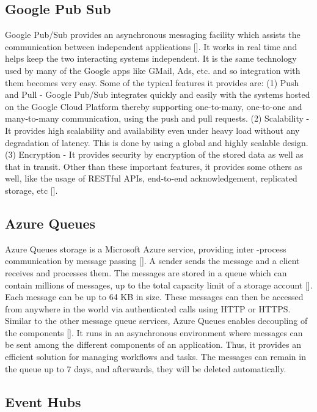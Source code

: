 \subsection{Google Pub Sub}

Google Pub/Sub provides an asynchronous messaging facility which
assists the communication between independent applications
 [\cite{www-google-pub-sub}]. It works in real time and helps keep the
two interacting systems independent. It is the same technology used by
many of the Google apps like GMail, Ads, etc. and so integration with
them becomes very easy.  Some of the typical features it provides are:
(1) Push and Pull - Google Pub/Sub integrates quickly and easily with
the systems hosted on the Google Cloud Platform thereby supporting
one-to-many, one-to-one and many-to-many communication, using the push
and pull requests. (2) Scalability - It provides high scalability and
availability even under heavy load without any degradation of
latency. This is done by using a global and highly scalable
design. (3) Encryption - It provides security by encryption of the
stored data as well as that in transit. Other than these important
features, it provides some others as well, like the usage of RESTful
APIs, end-to-end acknowledgement, replicated storage,
etc [\cite{www-google-pub-sub-features}].
     
\subsection{Azure Queues}

Azure Queues storage is a Microsoft Azure service, providing inter
-process communication by message
passing [\cite{silberschatz1998operating}].  A sender sends the message
and a client receives and processes them.  The messages are stored in
a queue which can contain millions of messages, up to the total
capacity limit of a storage account [\cite{www-azurequeue-web}].  Each
message can be up to 64 KB in size. These messages can then be
accessed from anywhere in the world via authenticated calls using HTTP
or HTTPS. Similar to the other message queue services, Azure Queues
enables decoupling of the components [\cite{www-tutorialspoint}]. It
runs in an asynchronous environment where messages can be sent among
the different components of an application. Thus, it provides an
efficient solution for managing workflows and tasks. The messages can
remain in the queue up to 7 days, and afterwards, they will be deleted
automatically.

\subsection{Event Hubs}


